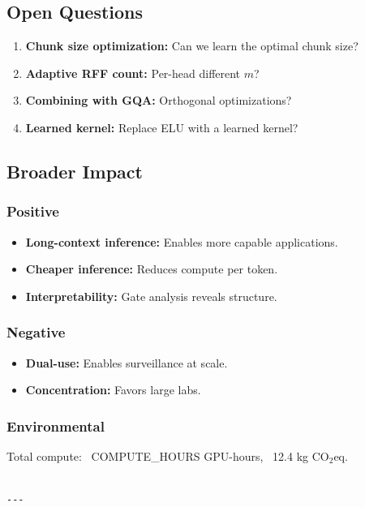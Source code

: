 \subsection{Open Questions}

\begin{enumerate}
\item \textbf{Chunk size optimization:} Can we learn the optimal chunk size?
\item \textbf{Adaptive RFF count:} Per-head different $m$?
\item \textbf{Combining with GQA:} Orthogonal optimizations?
\item \textbf{Learned kernel:} Replace ELU with a learned kernel?

\end{enumerate}
\subsection{Broader Impact}

\subsubsection{Positive}
\begin{itemize}
\item \textbf{Long-context inference:} Enables more capable applications.
\item \textbf{Cheaper inference:} Reduces compute per token.
\item \textbf{Interpretability:} Gate analysis reveals structure.

\end{itemize}
\subsubsection{Negative}
\begin{itemize}
\item \textbf{Dual-use:} Enables surveillance at scale.
\item \textbf{Concentration:} Favors large labs.

\end{itemize}
\subsubsection{Environmental}
Total compute: ~{{COMPUTE\_HOURS}} GPU-hours, ~12.4 kg CO$_2$eq.
\begin{lstlisting}

---
\end{lstlisting}